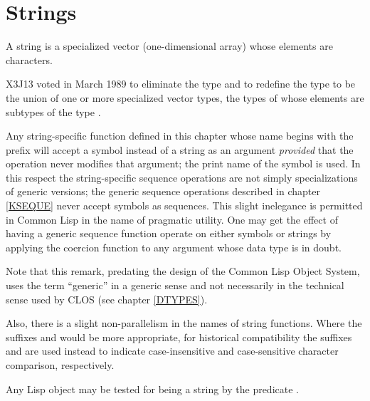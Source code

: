 
\ifx \rulang\Undef

\chapter{Strings}
\def\pagestatus{FINAL PROOF}

A string is a specialized vector (one-dimensional array)
whose elements are characters.

\begin{newer}
X3J13 voted in March 1989 
to eliminate the type  and to redefine the type
 to be the union of one or more specialized vector
types, the types of whose elements are subtypes of the type .
\end{newer}

Any string-specific function defined in this chapter
whose name begins with the prefix 
will accept a symbol instead of a string
as an argument \emph{provided} that the operation never modifies that argument;
the print name of the symbol is used.
In this respect the string-specific sequence operations are not
simply specializations of generic versions; the generic sequence
operations described in chapter \ref{KSEQUE} never accept symbols as sequences.
This slight inelegance is permitted in Common Lisp in the name of pragmatic utility.
One may get the effect of having a generic sequence function
operate on either symbols or strings by applying the coercion
function  to any argument whose data type is in doubt.

\begin{new}
Note that this remark, predating the design of the Common Lisp Object System,
uses the term ``generic'' in a generic sense and not necessarily
in the technical sense used by CLOS
(see chapter \ref{DTYPES}).
\end{new}

Also, there is a slight non-parallelism in the names of string functions.
Where the suffixes  and  would be more appropriate,
for historical compatibility the suffixes  and \cdf{=} are used instead
to indicate case-insensitive and case-sensitive character comparison,
respectively.

Any Lisp object may be tested for being a string by
the predicate .

